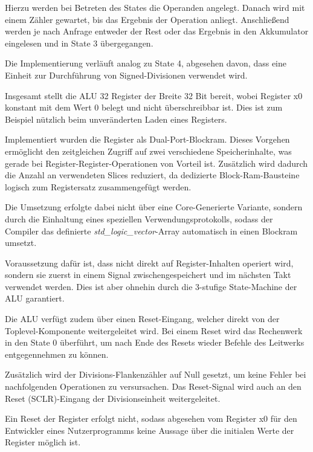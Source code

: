 Hierzu werden bei Betreten des States die Operanden angelegt. Danach wird mit einem Z\"ahler gewartet, bis das Ergebnis der Operation anliegt.
Anschlie\ss{}end werden je nach Anfrage entweder der Rest oder das Ergebnis in den Akkumulator eingelesen und in State 3 \"ubergegangen.

Die Implementierung verl\"auft analog zu State 4, abgesehen davon, dass eine Einheit zur Durchf\"uhrung von Signed-Divisionen verwendet wird.

Insgesamt stellt die ALU 32 Register der Breite 32 Bit bereit, wobei Register x0 konstant mit dem Wert 0 belegt und nicht \"uberschreibbar ist. Dies ist zum Beispiel n\"utzlich beim unver\"anderten Laden eines Registers.

Implementiert wurden die Register als Dual-Port-Blockram. Dieses Vorgehen erm\"oglicht den zeitgleichen Zugriff auf zwei verschiedene Speicherinhalte, was gerade bei Register-Register-Operationen von Vorteil ist. Zus\"atzlich wird dadurch die Anzahl an verwendeten Slices reduziert, da dedizierte Block-Ram-Bausteine logisch zum Registersatz zusammengef\"ugt werden.\vspace{10pt}

Die Umsetzung erfolgte dabei nicht \"uber eine Core-Generierte Variante, sondern durch die Einhaltung eines speziellen Verwendungsprotokolls, sodass der Compiler das definierte \textit{std\_logic\_vector}-Array automatisch in einen Blockram umsetzt.

Voraussetzung daf\"ur ist, dass nicht direkt auf Register-Inhalten operiert wird, sondern sie zuerst in einem Signal zwischengespeichert und im n\"achsten Takt verwendet werden. Dies ist aber ohnehin durch die 3-stufige State-Machine der ALU garantiert.

Die ALU verf\"ugt zudem \"uber einen Reset-Eingang, welcher direkt von der Toplevel-Komponente weitergeleitet wird. Bei einem Reset wird das Rechenwerk in den State 0 \"uberf\"uhrt, um nach Ende des Resets wieder Befehle des Leitwerks entgegennehmen zu k\"onnen.

Zus\"atzlich wird der Divisions-Flankenz\"ahler auf Null gesetzt, um keine Fehler bei nachfolgenden Operationen zu versursachen. Das Reset-Signal wird auch an den Reset (SCLR)-Eingang der Divisionseinheit weitergeleitet.

Ein Reset der Register erfolgt nicht, sodass abgesehen vom Register x0 f\"ur den Entwickler eines Nutzerprogramms keine Aussage \"uber die initialen Werte der Register m\"oglich ist.

